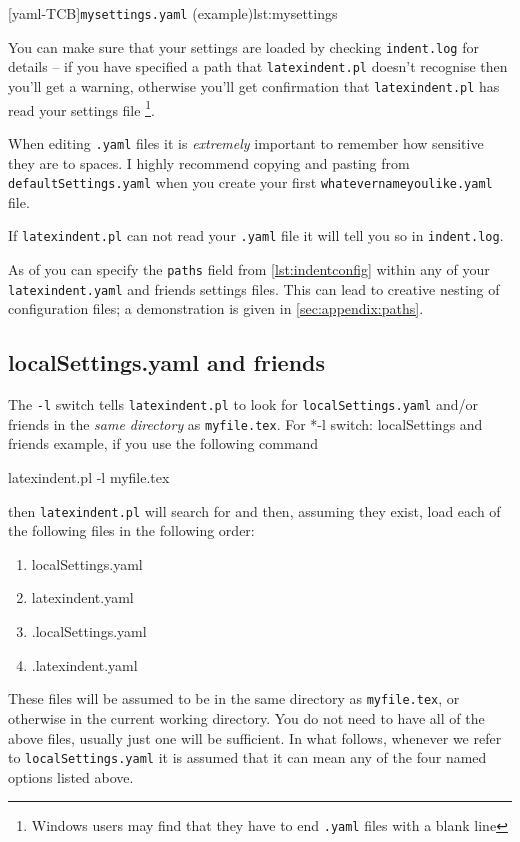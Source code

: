   [yaml-TCB]{\texttt{mysettings.yaml} (example)}{lst:mysettings}

  You can make sure that your settings are loaded by checking \texttt{indent.log} for
  details -- if you have specified a path that \texttt{latexindent.pl} doesn't recognise
  then you'll get a warning, otherwise you'll get confirmation that
  \texttt{latexindent.pl} has read your settings file \footnote{Windows users may find
  that they have to end \texttt{.yaml} files with a blank line}. 

  \begin{warning}
   When editing \texttt{.yaml} files it is \emph{extremely} important to remember how
   sensitive they are to spaces. I highly recommend copying and pasting from
   \texttt{defaultSettings.yaml} when you create your first
   \texttt{whatevernameyoulike.yaml} file.

   If \texttt{latexindent.pl} can not read your \texttt{.yaml} file it will tell you so
   in \texttt{indent.log}.
  \end{warning}

  As of  you can specify the
  \texttt{paths} field from \cref{lst:indentconfig} within any of your
  \texttt{latexindent.yaml} and friends settings files. This can lead to creative nesting
  of configuration files; a demonstration is given in \vref{sec:appendix:paths}.

 \subsection{localSettings.yaml and friends}\label{sec:localsettings}
  The \texttt{-l} switch tells \texttt{latexindent.pl} to look for
  \texttt{localSettings.yaml} and/or friends in the \emph{same directory} as
  \texttt{myfile.tex}. For%
  *{-l
  switch: localSettings and friends} example, if you use the following command

  \begin{commandshell}
latexindent.pl -l myfile.tex
\end{commandshell}

  then \texttt{latexindent.pl} will search for and then, assuming they exist, load each
  of the following files in the following order:
  \begin{enumerate}
   \item localSettings.yaml
   \item latexindent.yaml
   \item .localSettings.yaml
   \item .latexindent.yaml
  \end{enumerate}
  These files will be assumed to be in the same directory as \texttt{myfile.tex}, or
  otherwise in the current working directory. You do not need to have all of the above
  files, usually just one will be sufficient. In what follows, whenever we refer to
  \texttt{localSettings.yaml} it is assumed that it can mean any of the four named
  options listed above.

